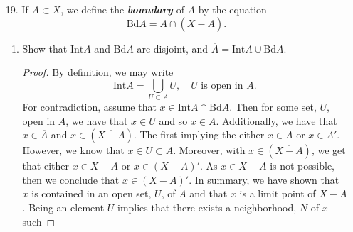 \documentclass[12pt]{article}
\theoremstyle{definition}
\begin{document}
\begin{enumerate}
\begin{proof}
                that $a\neq b$. Since $\Delta$ is closed, then its complement
                is open and $a\times b$ is an element of the complement. Thus
                there exists $U_1$ and $U_2$ such that $a\times b\in U_1\times
                U_2$ and $U_1\times U_2\subset\Delta^c$. Suppose that $U_1\cap
                U_2\neq\varnothing$, then there exists $u\times u\in U_1\times
                U_2$. However, $u\times u\in\Delta$ and so
                $\Delta\cap\Delta^c\neq\varnothing$, which is a contradiction.
                Therefore, $U_1\cap U_2=\varnothing$ and thus $X$ is Hausdorff.
            \end{proof}
        \item[19.] If $A\subset X$, we define the \textbf{\textit{boundary}} of $A$
            by the equation
            \begin{equation*}
                \text{Bd}A=\overline{A}\cap(\overline{X-A}).
            \end{equation*}
            \begin{enumerate}[label=(\alph*)]
                \item Show that $\text{Int}A$ and $\text{Bd}A$ are disjoint,
                    and $\overline{A}=\text{Int}A\cup\text{Bd}A$.
                    \begin{proof}
                        By definition, we may write 
                        \begin{equation*}
                            \text{Int}A = \bigcup_{U\subset A} U,\quad\text{$U$ is open in $A$}.
                        \end{equation*}
                        For contradiction, assume that $x\in\text{Int}A\cap\text{Bd}A$.
                        Then for some set, $U$, open in $A$, we have that $x\in U$ 
                        and so $x\in A$. Additionally, we have that 
                        $x\in \overline{A}$ and $x\in(\overline{X-A})$. The first 
                        implying the either $x\in A$ or $x\in A'$. However, we 
                        know that $x\in U\subset A$. Moreover, with $x\in(\overline{X-A})$, 
                        we get that either $x\in X-A$ or $x\in(X-A)'$. As $x\in X-A$ 
                        is not possible, then we conclude that $x\in (X-A)'$. In summary, 
                        we have shown that $x$ is contained in an open set, $U$, of 
                        $A$ and that $x$ is a limit point of $X-A$. Being an element 
                        $U$ implies that there exists a neighborhood, $N$ of $x$ such 

\end{proof}
\end{enumerate}
\end{enumerate}
\end{document}
